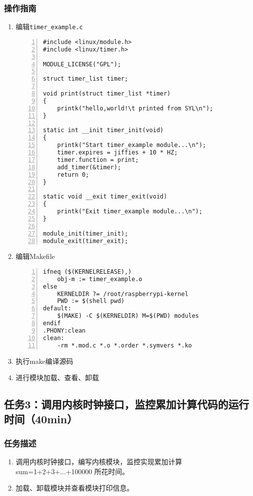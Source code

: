 \documentclass{article}
\begin{document}
\subsubsection{操作指南}
\begin{enumerate}
	\item 编辑\verb|timer_example.c|
\begin{lstlisting}[numbers=left]
#include <linux/module.h>
#include <linux/timer.h>

MODULE_LICENSE("GPL");

struct timer_list timer;

void print(struct timer_list *timer)
{
	printk("hello,world!\t printed from SYL\n");
}

static int __init timer_init(void)
{
	printk("Start timer_example module...\n");
	timer.expires = jiffies + 10 * HZ;
	timer.function = print;
	add_timer(&timer);
	return 0;
}

static void __exit timer_exit(void)
{
	printk("Exit timer_example module...\n");
}

module_init(timer_init);
module_exit(timer_exit);

\end{lstlisting}
    \item 编辑Makefile
\begin{lstlisting}[numbers=left]
ifneq ($(KERNELRELEASE),)
	obj-m := timer_example.o
else
	KERNELDIR ?= /root/raspberrypi-kernel
	PWD := $(shell pwd)
default:
	$(MAKE) -C $(KERNELDIR) M=$(PWD) modules
endif
.PHONY:clean
clean:
	-rm *.mod.c *.o *.order *.symvers *.ko

\end{lstlisting}
    \item 执行make编译源码
    \item 进行模块加载、查看、卸载
\end{enumerate}

\newpage




\subsection{任务3：调用内核时钟接口，监控累加计算代码的运行时间（40min）}

\subsubsection{任务描述}
\begin{enumerate}
    \item 调用内核时钟接口，编写内核模块，监控实现累加计算sum=1+2+3+...+100000 所花时间。
    \item 加载、卸载模块并查看模块打印信息。
\end{enumerate}
\end{document}
